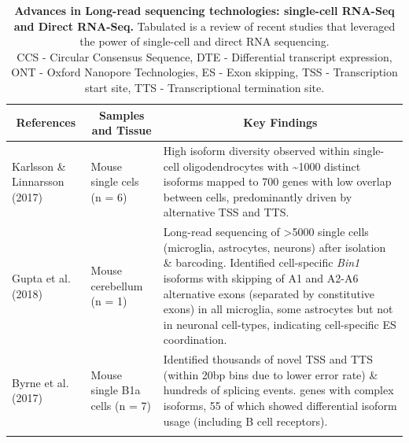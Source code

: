 \begin{landscape}
	\small %
	\setlength\tabcolsep{2pt} %
	\renewcommand{\arraystretch}{1}
	\begin{longtable}[c]{p{4cm}p{4cm}p{18cm}}
		\caption[Studies using long-read single-cell RNA-Seq and direct RNA-Seq]%
		{\textbf{Advances in Long-read sequencing technologies: single-cell RNA-Seq and Direct RNA-Seq.} Tabulated is a review of recent studies that leveraged the power of single-cell and direct RNA sequencing. \newline CCS - Circular Consensus Sequence, DTE - Differential transcript expression, ONT - Oxford Nanopore Technologies, ES - Exon skipping, TSS - Transcription start site, TTS - Transcriptional termination site.}
		\label{tab: longread_advancedstudies}\\
		
		\toprule
		\multicolumn{1}{c}{References} &
		\multicolumn{1}{c}{Samples and Tissue} &
		\multicolumn{1}{c}{Key Findings} \\* \midrule
		\endfirsthead
		\endhead
		\bottomrule
		\endfoot
		\endlastfoot
		\centering Karlsson \& Linnarsson (2017)\cite{Karlsson2017} &
		\centering Mouse single cels (n = 6)  &
		\tabitem High isoform diversity observed within single-cell oligodendrocytes with \textasciitilde1000 distinct isoforms mapped to 700 genes with low overlap between cells, predominantly driven by alternative TSS and TTS. \\
		\hdashline[0.5pt/5pt]	
		
		\centering Gupta et al. (2018) \cite{Gupta2018} &
		\centering Mouse cerebellum (n = 1)  &
		\tabitem Long-read sequencing of >5000 single cells (microglia, astrocytes, neurons) after isolation \& barcoding. \newline 
		\tabitem Identified cell-specific \textit{Bin1} isoforms with skipping of A1 and A2-A6 alternative exons (separated by constitutive exons) in all microglia, some astrocytes but not in neuronal cell-types, indicating cell-specific ES coordination. \\
		\hdashline[0.5pt/5pt]			
		
		\centering Byrne et al. (2017)\cite{Byrne2017} &
		\centering Mouse single B1a cells \newline(n = 7) &
		\tabitem Identified thousands of novel TSS and TTS (within 20bp bins due to lower error rate) \& hundreds of splicing events.\newline
		\tabitem 160 genes with complex isoforms, 55 of which showed differential isoform usage (including B cell receptors). \\
		\hdashline[0.5pt/5pt]
		

\end{longtable}
\end{landscape}
